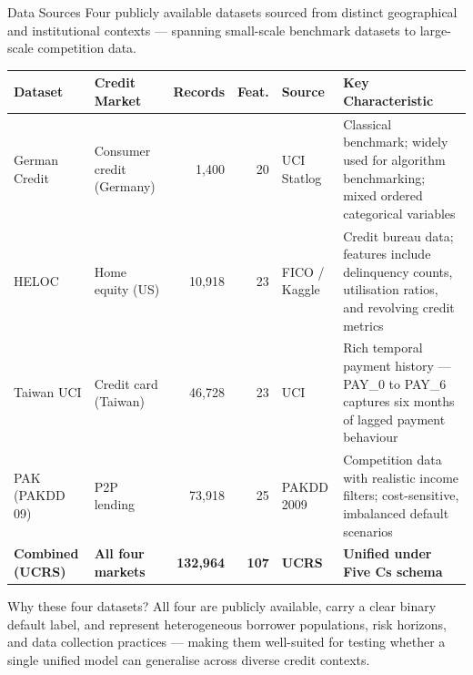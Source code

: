 \documentclass[9pt,aspectratio=169]{beamer}
\begin{document}
\begin{frame}{Data Sources}
\vspace{-2pt}
{\footnotesize Four publicly available datasets sourced from distinct geographical and institutional contexts ---
spanning small-scale benchmark datasets to large-scale competition data.}\\[5pt]
\begin{center}
\scriptsize
\setlength{\tabcolsep}{4pt}
\begin{tabular}{l l r r l p{5.2cm}}
  \toprule
  \textbf{Dataset} & \textbf{Credit Market} & \textbf{Records} & \textbf{Feat.} & \textbf{Source} & \textbf{Key Characteristic}\\
  \midrule
  German Credit  & Consumer credit (Germany) &  1,400 & 20 & UCI Statlog   & Classical benchmark; widely used for algorithm benchmarking; mixed ordered categorical variables\\[3pt]
  HELOC          & Home equity (US)          & 10,918 & 23 & FICO / Kaggle & Credit bureau data; features include delinquency counts, utilisation ratios, and revolving credit metrics\\[3pt]
  Taiwan UCI     & Credit card (Taiwan)      & 46,728 & 23 & UCI           & Rich temporal payment history --- PAY\_0 to PAY\_6 captures six months of lagged payment behaviour\\[3pt]
  PAK (PAKDD 09) & P2P lending               & 73,918 & 25 & PAKDD 2009    & Competition data with realistic income filters; cost-sensitive, imbalanced default scenarios\\[3pt]
  \midrule
  \textbf{Combined (UCRS)} & \textbf{All four markets} & \textbf{132,964} & \textbf{107} & \textbf{UCRS} & \textbf{Unified under Five Cs schema}\\
  \bottomrule
\end{tabular}
\end{center}
\vspace{4pt}
\begin{block}{Why these four datasets?}
  \footnotesize
  All four are publicly available, carry a clear binary default label, and represent heterogeneous
  borrower populations, risk horizons, and data collection practices --- making them well-suited
  for testing whether a single unified model can generalise across diverse credit contexts.
\end{block}
\end{frame}
\end{document}
